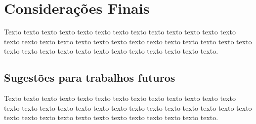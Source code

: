\chapter{Considerações Finais}

Texto texto texto texto texto texto texto texto texto texto texto texto texto texto texto texto texto texto texto texto texto texto texto texto texto texto texto texto texto texto texto texto texto texto texto texto texto texto texto.

\section{Sugestões para trabalhos futuros}

Texto texto texto texto texto texto texto texto texto texto texto texto texto texto texto texto texto texto texto texto texto texto texto texto texto texto texto texto texto texto texto texto texto texto texto texto texto texto texto.
